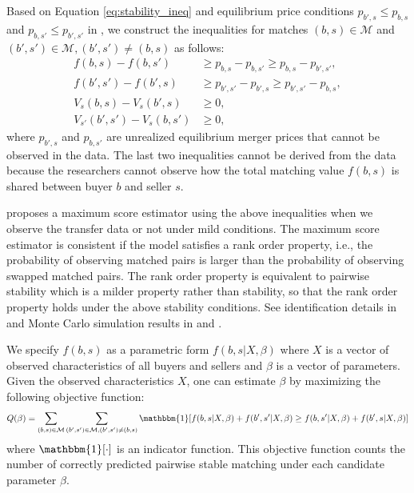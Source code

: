 \documentclass[10pt]{article}
\begin{document}
Based on Equation \eqref{eq:stability_ineq} and equilibrium price conditions $p_{b',s}\le p_{b,s}$ and $p_{b,s'}\le p_{b',s'}$ in \cite{akkus2015ms}, we construct the inequalities for matches $(b,s)\in \mathcal{M}$ and $(b',s')\in \mathcal{M}, (b',s')\neq(b,s)$ as follows:
\begin{align}
    f(b,s)-f(b,s')&\ge p_{b,s}-p_{b,s'}\ge p_{b,s}-p_{b',s'},\label{eq:pairwise_stable_ineq}\\
    f(b',s')-f(b',s)&\ge p_{b',s'}-p_{b',s}\ge p_{b',s'}-p_{b,s},\nonumber\\
    V_s(b,s)-V_s(b',s)&\ge 0,\nonumber\\
    V_{s'}(b',s')-V_s(b,s')&\ge 0,\nonumber
\end{align}
where $p_{b',s}$ and $p_{b,s'}$ are unrealized equilibrium merger prices that cannot be observed in the data. The last two inequalities cannot be derived from the data because the researchers cannot observe how the total matching value $f(b,s)$ is shared between buyer $b$ and seller $s$.

\cite{fox2018qe} proposes a maximum score
estimator using the above inequalities when we observe the transfer data or not under mild conditions. 
The maximum score estimator is consistent if the model satisfies a rank order property, i.e., the probability of observing matched pairs is larger than the probability of observing swapped matched pairs. 
The rank order property is equivalent to pairwise stability which is a milder property rather than stability, so that the rank order property holds under the above stability conditions. See identification details in \cite{fox2010qe} and Monte Carlo simulation results in \cite{fox2018qe} and \cite{otani2021matching_cost}.

We specify $f(b,s)$ as a parametric form $f(b,s|X,\beta)$ where $X$ is a vector of observed characteristics of all buyers and sellers and $\beta$ is a vector of parameters. 
Given the observed characteristics $X$, one can estimate $\beta$ by maximizing the following objective function:
\begin{align}
    Q(\beta)=\sum_{(b,s)\in \mathcal{M}} \sum_{(b',s')\in \mathcal{M},(b',s')\neq (b,s)} \mathbbm{1}[f(b,s|X,\beta)+ f(b',s'|X,\beta)\ge f(b,s'|X,\beta)+f(b',s|X,\beta)]\label{eq:score_function}
\end{align}
where $\mathbbm{1}[\cdot]$ is an indicator function. This objective function counts the number of correctly predicted pairwise stable matching under each candidate parameter $\beta$.
\end{document}
